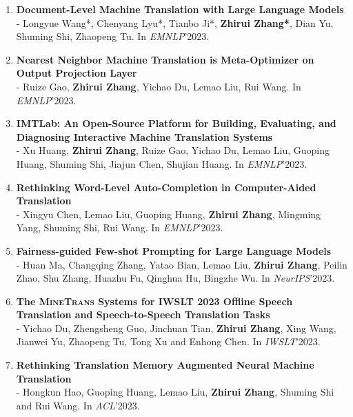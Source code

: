 \documentclass{resume}
\begin{document}
\begin{enumerate}

\item \normalsize \textbf{Document-Level Machine Translation with Large Language Models}\\ 
\small - Longyue Wang*, Chenyang Lyu*, Tianbo Ji*, \textbf{Zhirui Zhang*}, Dian Yu, Shuming Shi, Zhaopeng Tu. In \textit{EMNLP}'2023.

\item \normalsize \textbf{Nearest Neighbor Machine Translation is Meta-Optimizer on Output Projection Layer}\\ 
\small - Ruize Gao,  \textbf{Zhirui Zhang}, Yichao Du, Lemao Liu, Rui Wang. In \textit{EMNLP}'2023.

\item \normalsize \textbf{IMTLab: An Open-Source Platform for Building, Evaluating, and Diagnosing Interactive Machine Translation Systems}\\ 
\small - Xu Huang, \textbf{Zhirui Zhang}, Ruize Gao, Yichao Du, Lemao Liu, Guoping Huang, Shuming Shi, Jiajun Chen, Shujian Huang. In \textit{EMNLP}'2023.

\item \normalsize \textbf{Rethinking Word-Level Auto-Completion in Computer-Aided Translation}\\ 
\small - Xingyu Chen, Lemao Liu, Guoping Huang, \textbf{Zhirui Zhang}, Mingming Yang, Shuming Shi, Rui Wang. In \textit{EMNLP}'2023.

\item \normalsize \textbf{Fairness-guided Few-shot Prompting for Large Language Models}\\ 
\small - Huan Ma, Changqing Zhang, Yatao Bian, Lemao Liu, \textbf{Zhirui Zhang}, Peilin Zhao, Shu Zhang, Huazhu Fu, Qinghua Hu, Bingzhe Wu. In \textit{NeurIPS}'2023.

\item \normalsize \textbf{The \textsc{MineTrans} Systems for IWSLT 2023 Offline Speech Translation and Speech-to-Speech Translation Tasks}\\ 
\small - Yichao Du, Zhengsheng Guo, Jinchuan Tian, \textbf{Zhirui Zhang}, Xing Wang, Jianwei Yu, Zhaopeng Tu, Tong Xu and Enhong Chen. In \textit{IWSLT}'2023.

\item \normalsize \textbf{Rethinking Translation Memory Augmented Neural Machine Translation}\\
\small -  Hongkun Hao, Guoping Huang, Lemao Liu, \textbf{Zhirui Zhang}, Shuming Shi and Rui Wang. In \textit{ACL}'2023.


\end{enumerate}
\end{document}
